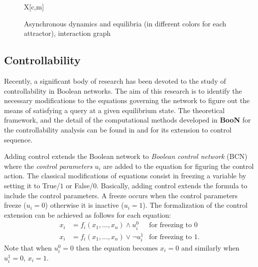 \documentclass[numsec,webpdf,modern,large]{oup-authoring-template}
\newcommand{\boon}[0]{\textbf{BooN}\xspace}
\begin{document}
\begin{figure}[h]
\begin{tabu}{X[c,m]}
		\end{tabu}
		\caption{Asynchronous dynamics and equilibria (in different colors for each attractor), interaction graph}
		\label{fig:boon1}
	\end{figure}

\subsection{Controllability}
	\label{subsec:controllability}
	Recently, a significant body of research
	  has been devoted to the study of controllability in Boolean networks.
The aim of this research is to identify the necessary modifications to the equations governing the network to figure out the means of satisfying a query at a given equilibrium state. The theoretical framework, and the detail of the computational methods developed in \boon for the controllability analysis can be found in\citep{biane2019} and \citep{pardo2021} for its extension to control sequence.

Adding control extends the Boolean network to \emph{Boolean control network} (BCN) where the \emph{control parameters} $u_i$ are added to the equation for figuring the control action.
The classical modifications of equations consist in freezing a variable by setting it to True/$1$ or False/$0$.
Basically, adding control extends the formula to include the control parameters.
A freeze occurs when the control parameters freeze ($u_i=0$) otherwise it is inactive ($u_i=1$). The formalization of the control extension can be achieved as follows for each equation:
\begin{align*}
	x_i &= f_i(x_1, \ldots, x_n) \land u^0_i &\text{for freezing to $0$}\\
	x_i &= f_i(x_1, \ldots, x_n) \lor \neg u^1_i &\text{for freezing to $1$}.
\end{align*}
Note that when $u^0_i = 0$ then the equation becomes $x_i=0$ and similarly when $u^1_i=0$,  $x_i=1$.
\end{document}
